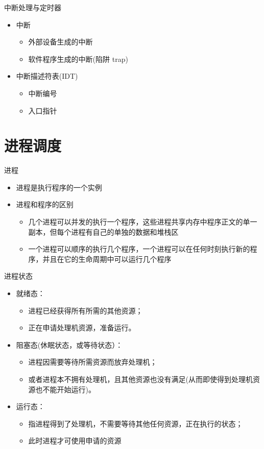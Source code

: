 \begin{frame}{中断处理与定时器}
     \begin{itemize}
     \item 中断
           \begin{itemize}
           \item 外部设备生成的中断
           \item 软件程序生成的中断(陷阱 trap)
           \end{itemize}
     \item 中断描述符表(IDT)
           \begin{itemize}
           \item 中断编号
           \item 入口指针
           \end{itemize}
     \end{itemize}
\end{frame}


\section{进程调度}
\begin{frame}{进程}
\begin{itemize}
\item 进程是执行程序的一个实例
\item 进程和程序的区别	
\begin{itemize}
\item 几个进程可以并发的执行一个程序，这些进程共享内存中程序正文的单一副本，但每个进程有自己的单独的数据和堆栈区
\item 一个进程可以顺序的执行几个程序，一个进程可以在任何时刻执行新的程序，并且在它的生命周期中可以运行几个程序
\end{itemize}
\end{itemize}
\end{frame}

\begin{frame}{进程状态}
\begin{itemize}
\item 就绪态：
\begin{itemize}
\item 进程已经获得所有所需的其他资源；
\item 正在申请处理机资源，准备运行。
\end{itemize}
\item 阻塞态(休眠状态，或等待状态）：
\begin{itemize}
\item 进程因需要等待所需资源而放弃处理机；
\item 或者进程本不拥有处理机，且其他资源也没有满足(从而即使得到处理机资源也不能开始运行)。
\end{itemize}
\item 运行态：
\begin{itemize}
\item 指进程得到了处理机，不需要等待其他任何资源，正在执行的状态；
\item 此时进程才可使用申请的资源
\end{itemize}
\end{itemize}
\end{frame}

